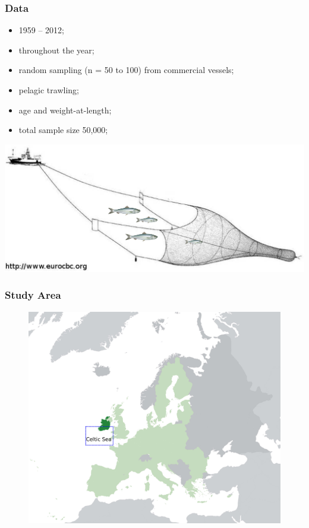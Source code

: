 \documentclass{beamer}
\begin{document}
\begin{frame}
\frametitle{Data}
    \begin{itemize}
        \item 1959 -- 2012;
        \item throughout the year;
        \item random sampling (n = 50 to 100) from commercial vessels;
        \item pelagic trawling;
        \item age and weight-at-length;
        \item total sample size 50,000;
    \end{itemize}
\begin{center}
{\includegraphics[scale=0.4]{../fig/trawl} }
\end{center}
        
\end{frame}


\begin{frame}
\frametitle{Study Area}
\begin{figure}
\includegraphics[width=1.1\linewidth,height=0.85\textheight,keepaspectratio]{../fig/EU-Ireland} 
\end{figure}
\end{frame}
\end{document}
